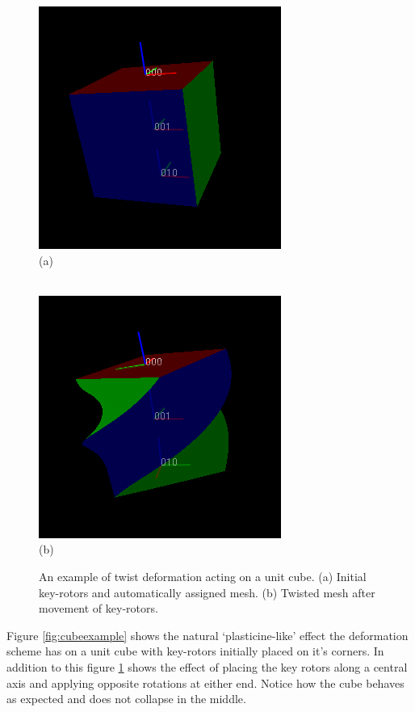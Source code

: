 \begin{figure}[p]
\centering
\includegraphics[height=0.37\textheight]{twist_cube_before} \\
\noindent (a) \\ \rule{0pt}{\parskip} \\
\includegraphics[height=0.37\textheight]{twist_cube_after} \\
\noindent (b) 
\caption{\label{fig:twistcubeexample}An example of twist deformation acting on a unit cube.
  (a) Initial key-rotors and automatically assigned mesh. 
  (b) Twisted mesh after movement of key-rotors.} 
\end{figure}

Figure \ref{fig:cubeexample} shows the natural `plasticine-like' effect the deformation
scheme has on a unit cube with key-rotors initially placed on it's corners. In addition to
this figure \ref{fig:twistcubeexample} shows the effect of placing the key rotors along
a central axis and applying opposite rotations at either end. Notice how the cube behaves as
expected and does not collapse in the middle.

